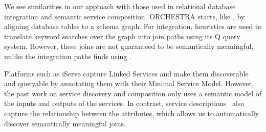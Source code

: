 We see similarities in our approach with those used in relational database integration and semantic service composition.  
ORCHESTRA\cite{ives2008orchestra} starts, like \rtworml, by aligning database tables to a schema graph.  
For integration, heuristics are used to translate keyword searches over the graph into join paths using its Q query system. 
However, these joins are not guaranteed to be semantically meaningful, unlike the integration paths \karma finds using \rtworml.

Platforms such as iServe\cite{pedrinaci2010iserve} capture Linked Services and make them discoverable and queryable by annotating them with their Minimal Service Model.  However, the past work on service discovery and composition only uses a semantic model of the inputs and outputs of the services.  In contrast, \karma service descriptions~\cite{taheriyan12:lapis} also capture the relationship between the attributes, which allows us to automatically discover semantically meaningful joins. 
